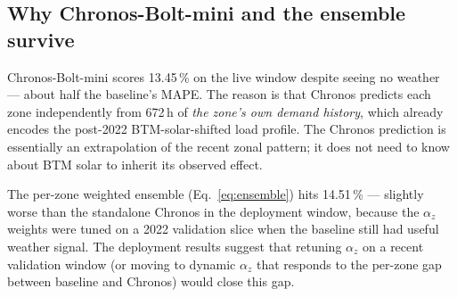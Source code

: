 \subsection{Why Chronos-Bolt-mini and the ensemble survive}

Chronos-Bolt-mini scores 13.45\,\% on the live window despite seeing no weather --- about half the baseline's MAPE. The reason is that Chronos predicts each zone independently from 672\,h of \emph{the zone's own demand history}, which already encodes the post-2022 BTM-solar-shifted load profile. The Chronos prediction is essentially an extrapolation of the recent zonal pattern; it does not need to know about BTM solar to inherit its observed effect.

The per-zone weighted ensemble (Eq.~\ref{eq:ensemble}) hits 14.51\,\% --- slightly worse than the standalone Chronos in the deployment window, because the $\alpha_z$ weights were tuned on a 2022 validation slice when the baseline still had useful weather signal. The deployment results suggest that retuning $\alpha_z$ on a recent validation window (or moving to dynamic $\alpha_z$ that responds to the per-zone gap between baseline and Chronos) would close this gap.
